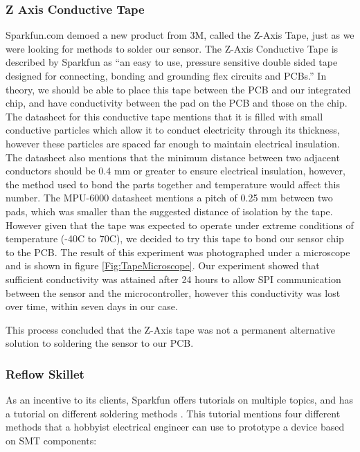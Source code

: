 \subsubsection{Z Axis Conductive Tape}
\label{Sec:ZTape}
Sparkfun.com demoed a new product from 3M,
called the Z-Axis Tape,
just as we were looking for methods to solder our sensor.
The Z-Axis Conductive Tape is described by Sparkfun as ``an easy to use,
pressure sensitive double sided tape designed for connecting,
bonding and grounding flex circuits and PCBs.''
In theory, we should be able to place this tape between the PCB and our integrated chip,
and have conductivity between the pad on the PCB and those on the chip.
The datasheet for this conductive tape mentions that it is filled with small conductive particles which allow it to conduct electricity through its thickness,
however these particles are spaced far enough to maintain electrical insulation.
The datasheet also mentions that the minimum distance between two adjacent conductors should be 0.4 mm or greater to ensure electrical insulation,
however, the method used to bond the parts together and temperature would affect this number.
The MPU-6000 datasheet mentions a pitch of 0.25 mm between two pads,
which was smaller than the suggested distance of isolation by the tape.
However given that the tape was expected to operate under extreme conditions of temperature (-40\degree C to 70\degree C),
we decided to try this tape to bond our sensor chip to the PCB.
The result of this experiment was photographed under a microscope and is shown in figure \ref{Fig:TapeMicroscope}.
Our experiment showed that sufficient conductivity was attained after 24 hours to allow SPI communication between the sensor and the microcontroller,
however this conductivity was lost over time,
within seven days in our case.

This process concluded that the Z-Axis tape was not a permanent alternative solution to soldering the sensor to our PCB.

\subsubsection{Reflow Skillet}
\label{Sec:ToasterReflow}
As an incentive to its clients,
Sparkfun offers tutorials on multiple topics,
and has a tutorial on different soldering methods \cite{Web:SparkfunSoldering}.
This tutorial mentions four different methods that a hobbyist electrical engineer can use to prototype a device based on SMT components:

